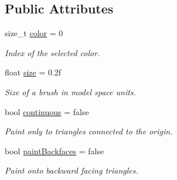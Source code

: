 \subsection*{Public Attributes}
\begin{DoxyCompactItemize}
\item 
\mbox{\label{structpepr3d_1_1_brush_settings_a926d73e6b64dda9d777ba090074bd031}} 
size\+\_\+t \mbox{\hyperlink{structpepr3d_1_1_brush_settings_a926d73e6b64dda9d777ba090074bd031}{color}} = 0
\begin{DoxyCompactList}\small\item\em Index of the selected color. \end{DoxyCompactList}\item 
\mbox{\label{structpepr3d_1_1_brush_settings_a01300f710ecd757b8f532a1da1f3bc4c}} 
float \mbox{\hyperlink{structpepr3d_1_1_brush_settings_a01300f710ecd757b8f532a1da1f3bc4c}{size}} = 0.\+2f
\begin{DoxyCompactList}\small\item\em Size of a brush in model space units. \end{DoxyCompactList}\item 
\mbox{\label{structpepr3d_1_1_brush_settings_a45ac5bb04d5a502b31811ecd94d6fe2b}} 
bool \mbox{\hyperlink{structpepr3d_1_1_brush_settings_a45ac5bb04d5a502b31811ecd94d6fe2b}{continuous}} = false
\begin{DoxyCompactList}\small\item\em Paint only to triangles connected to the origin. \end{DoxyCompactList}\item 
\mbox{\label{structpepr3d_1_1_brush_settings_ab509aa6a59f8a36b9de2ae9d579a47f7}} 
bool \mbox{\hyperlink{structpepr3d_1_1_brush_settings_ab509aa6a59f8a36b9de2ae9d579a47f7}{paint\+Backfaces}} = false
\begin{DoxyCompactList}\small\item\em Paint onto backward facing triangles. \end{DoxyCompactList}\item 
\mbox{\label{structpepr3d_1_1_brush_settings_adddaabb9e5cd0271e781423eb77765db}} 

\end{DoxyCompactItemize}
